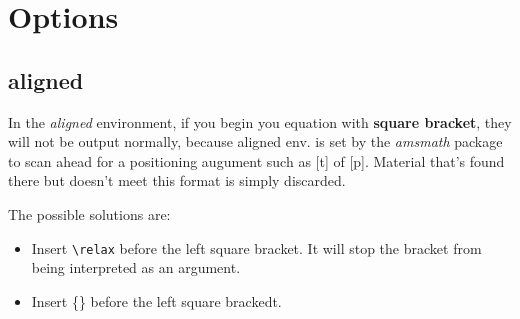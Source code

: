\section{Options}
\subsection{aligned}
In the \emph{aligned} environment, if you begin you equation with \textbf{square bracket},
they will not be output normally, because aligned env. is set by the \emph{amsmath} package to scan ahead for a positioning augument such as [t] of [p]. Material that's found there but doesn't meet this format is simply discarded.	

The possible solutions are:
\begin{itemize}
    \item Insert \verb|\relax| before the left square bracket. It will stop the bracket from being interpreted as an argument.
    \item Insert \{\} before the left square brackedt.
\end{itemize}
